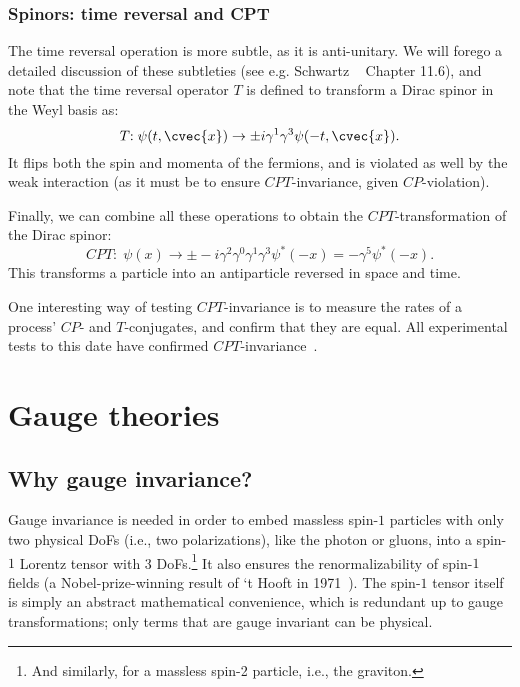 \subsubsection{Spinors: time reversal and CPT}

The time reversal operation is more subtle, as it is anti-unitary.
We will forego a detailed discussion of these subtleties (see e.g. Schwartz ~\cite{Schwartz:2014sze} Chapter 11.6), and note that the time reversal operator $T$ is defined to transform a Dirac spinor in the Weyl basis as:
\begin{equation}
	\label{eq:01_qft_spinors_cpt_time_reversal}
	T\mathrm{:\;} \psi(t, \cvec{x}) \rightarrow \pm i\gamma^1\gamma^3\psi(-t, \cvec{x}).
\end{equation}
It flips both the spin and momenta of the fermions, and is violated as well by the weak interaction (as it must be to ensure $CPT$-invariance, given $CP$-violation).

Finally, we can combine all these operations to obtain the $CPT$-transformation of the Dirac spinor:
\begin{equation}
	\label{eq:01_qft_spinors_cpt_cpt}
	CPT\mathrm{:\;} \psi(x) \rightarrow \pm -i\gamma^2\gamma^0\gamma^1\gamma^3\psi^*(-x) = -\gamma^5\psi^*(-x).
\end{equation}
This transforms a particle into an antiparticle reversed in space and time.

One interesting way of testing $CPT$-invariance is to measure the rates of a process' $CP$- and $T$-conjugates, and confirm that they are equal.
All experimental tests to this date have confirmed $CPT$-invariance~\cite{ParticleDataGroup:2024cfk}.


\section{Gauge theories}
\label{app:01_qft_gt}

\subsection{Why gauge invariance?}
\label{sec:01_qft_gt_why}

Gauge invariance is needed in order to embed massless spin-$1$ particles with only two physical DoFs (i.e., two polarizations), like the photon or gluons, into a spin-$1$ Lorentz tensor with 3 DoFs.\footnote{And similarly, for a massless spin-2 particle, i.e., the graviton.}
It also ensures the renormalizability of spin-$1$ fields (a Nobel-prize-winning result of `t Hooft in 1971~\cite{tHooft:1971akt, tHooft:1971qjg}).
The spin-$1$ tensor itself is simply an abstract mathematical convenience, which is redundant up to gauge transformations; only terms that are gauge invariant can be physical.

